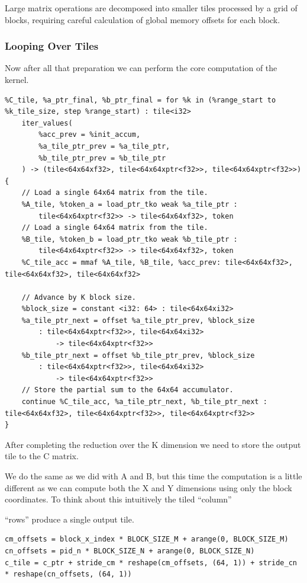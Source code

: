 \documentclass{article}
\begin{document}
Large matrix operations are decomposed into smaller tiles processed by a grid of blocks, requiring careful calculation of global memory offsets for each block.



\subsubsection{Looping Over Tiles}

Now after all that preparation we can perform the core computation of the kernel.


\begin{lstlisting}
%C_tile, %a_ptr_final, %b_ptr_final = for %k in (%range_start to %k_tile_size, step %range_start) : tile<i32>
    iter_values(
        %acc_prev = %init_accum,
        %a_tile_ptr_prev = %a_tile_ptr,
        %b_tile_ptr_prev = %b_tile_ptr
    ) -> (tile<64x64xf32>, tile<64x64xptr<f32>>, tile<64x64xptr<f32>>)
{
    // Load a single 64x64 matrix from the tile.
    %A_tile, %token_a = load_ptr_tko weak %a_tile_ptr :
        tile<64x64xptr<f32>> -> tile<64x64xf32>, token
    // Load a single 64x64 matrix from the tile.
    %B_tile, %token_b = load_ptr_tko weak %b_tile_ptr :
        tile<64x64xptr<f32>> -> tile<64x64xf32>, token
    %C_tile_acc = mmaf %A_tile, %B_tile, %acc_prev: tile<64x64xf32>, tile<64x64xf32>, tile<64x64xf32>

    // Advance by K block size.
    %block_size = constant <i32: 64> : tile<64x64xi32>
    %a_tile_ptr_next = offset %a_tile_ptr_prev, %block_size
        : tile<64x64xptr<f32>>, tile<64x64xi32>
            -> tile<64x64xptr<f32>>
    %b_tile_ptr_next = offset %b_tile_ptr_prev, %block_size
        : tile<64x64xptr<f32>>, tile<64x64xi32>
            -> tile<64x64xptr<f32>>
    // Store the partial sum to the 64x64 accumulator.
    continue %C_tile_acc, %a_tile_ptr_next, %b_tile_ptr_next : tile<64x64xf32>, tile<64x64xptr<f32>>, tile<64x64xptr<f32>>
}
\end{lstlisting}

After completing the reduction over the K dimension we need to store the output tile to the C matrix.


We do the same as we did with A and B, but this time the computation is a little different as we can compute both the X and Y dimensions using only the block coordinates. To think about this intuitively the tiled ``column''

``rows'' produce a single output tile.


\begin{lstlisting}
cm_offsets = block_x_index * BLOCK_SIZE_M + arange(0, BLOCK_SIZE_M)
cn_offsets = pid_n * BLOCK_SIZE_N + arange(0, BLOCK_SIZE_N)
c_tile = c_ptr + stride_cm * reshape(cm_offsets, (64, 1)) + stride_cn * reshape(cn_offsets, (64, 1))
\end{lstlisting}
\end{document}

